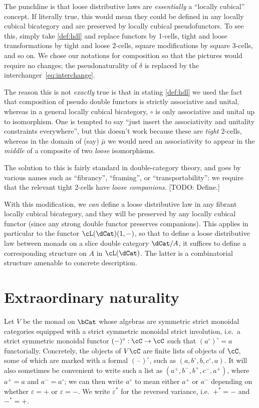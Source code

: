 \documentclass{amsart}
\let\oc\circ
\newcommand{\C}{\cC}
\newcommand{\Smult}{\mu}
\newcommand{\dl}{\delta}
\newcommand{\Sdlmult}{\bar\Smult}%
\newcommand{\blank}{\mathord{\hspace{1pt}\text{--}\hspace{1pt}}}
\renewcommand{\o}{^{\circ}}
\newcommand{\p}{^{+}}
\newcommand{\m}{^{-}}
\newcommand{\e}[1][]{^{\varepsilon_{#1}}}
\begin{document}
The punchline is that loose distributive laws are \emph{essentially} a ``locally cubical'' concept.
If literally true, this would mean they could be defined in any locally cubical bicategory and are preserved by locally cubical pseudofunctors.
To see this, simply take \cref{def:hdl} and replace functors by 1-cells, tight and loose transformations by tight and loose 2-cells, square modifications by square 3-cells, and so on.
We chose our notations for composition so that the pictures would require no changes; the pseudonaturality of $\dl$ is replaced by the interchanger~\eqref{eq:interchange}.

The reason this is not \emph{exactly} true is that in stating \cref{def:hdl} we used the fact that composition of pseudo double functors is strictly associative and unital, whereas in a general locally cubical bicategory, $\oc$ is only associative and unital up to isomorphism.
One is tempted to say ``just insert the associativity and unitality constraints everywhere'', but this doesn't work because these are \emph{tight} 2-cells, whereas in the domain of (say) $\Sdlmult$ we would need an associativity to appear in the \emph{middle} of a composite of two \emph{loose} isomorphisms.

The solution to this is fairly standard in double-category theory, and goes by various names such as ``fibrancy'', ``framing'', or ``transportability'': we require that the relevant tight 2-cells have \emph{loose companions}.
[TODO: Define.]

With this modification, we \emph{can} define a loose distributive law in any fibrant locally cubical bicategory, and they will be preserved by any locally cubical functor (since any strong double functor preserves companions).
This applies in particular to the functor $\cL(\dCat)(1,-)$, so that to define a loose distributive law between monads on a slice double category $\dCat/A$, it suffices to define a corresponding structure on $A$ in $\cL(\dCat)$.
The latter is a combinatorial structure amenable to concrete description.


\section{Extraordinary naturality}
\label{sec:extranat}

Let $V$ be the monad on $\bCat$ whose algebras are symmetric strict monoidal categories equipped with a strict symmetric monoidal strict involution, i.e.\ a strict symmetric monoidal functor $(-)\o : \C\to\C$ such that $(a\o)\o =a$ functorially.
Concretely, the objects of $V\C$ are finite lists of objects of $\C$, some of which are marked with a formal $(\blank)\o$, such as $(a,b\o,b,c\o,a)$.
It will also sometimes be convenient to write such a list as $(a\p,b\m,b\p,c\m,a\p)$, where $a\p=a$ and $a\m=a\o$; we can then write $a\e$ to mean either $a\p$ or $a\m$ depending on whether $\varepsilon=+$ or $\varepsilon=-$.
We write $\varepsilon^*$ for the reversed variance, i.e.\ $+^*=-$ and $-^*=+$.
\end{document}
